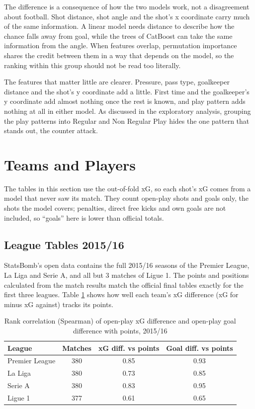 The difference is a consequence of how the two models work, not a disagreement about football. Shot distance, shot angle and the shot's x coordinate carry much of the same information. A linear model needs distance to describe how the chance falls away from goal, while the trees of CatBoost can take the same information from the angle. When features overlap, permutation importance shares the credit between them in a way that depends on the model, so the ranking within this group should not be read too literally.

The features that matter little are clearer. Pressure, pass type, goalkeeper distance and the shot's y coordinate add a little. First time and the goalkeeper's y coordinate add almost nothing once the rest is known, and play pattern adds nothing at all in either model. As discussed in the exploratory analysis, grouping the play patterns into Regular and Non Regular Play hides the one pattern that stands out, the counter attack.

\newpage

\section{Teams and Players}\label{res:teams}

The tables in this section use the out-of-fold xG, so each shot's xG comes from a model that never saw its match. They count open-play shots and goals only, the shots the model covers; penalties, direct free kicks and own goals are not included, so ``goals'' here is lower than official totals.

\subsection{League Tables 2015/16}

StatsBomb's open data contains the full 2015/16 seasons of the Premier League, La Liga and Serie A, and all but 3 matches of Ligue 1. The points and positions calculated from the match results match the official final tables exactly for the first three leagues. Table \ref{tab:spearman} shows how well each team's xG difference (xG for minus xG against) tracks its points.

\begin{table}[!h]
\centering
\begin{tabular}{|l|c|c|c|}
\hline
\textbf{League} & \textbf{Matches} & \textbf{xG diff. vs points} & \textbf{Goal diff. vs points} \\
\hline
Premier League & 380 & 0.85 & 0.93 \\
La Liga & 380 & 0.73 & 0.85 \\
Serie A & 380 & 0.83 & 0.95 \\
Ligue 1 & 377 & 0.61 & 0.65 \\
\hline
\end{tabular}
\caption{Rank correlation (Spearman) of open-play xG difference and open-play goal difference with points, 2015/16}
\label{tab:spearman}
\end{table}

